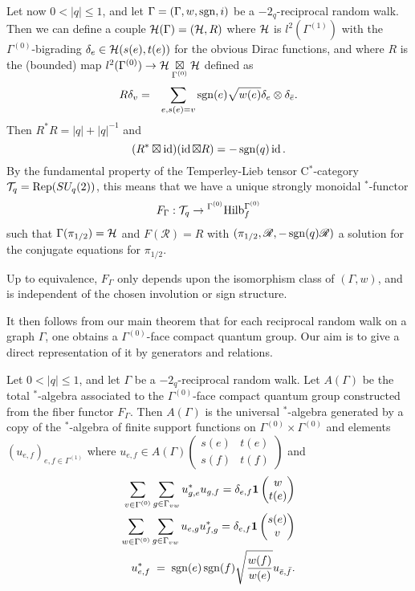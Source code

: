 Let now $0<|q|\leq 1$, and let $\Gamma = (\Gamma,w,\operatorname{\mathrm{sgn}},i)$ be a $-2_q$-reciprocal random walk. Then we can define a couple $\mathcal{H}(\Gamma) = (\mathcal{H},R)$ where $\mathcal{H}$ is $l^2(\Gamma^{(1)})$ with the $\Gamma^{(0)}$-bigrading $\delta_e \in \mathcal{H}(s(e),t(e))$ for the obvious Dirac functions, and where $R$ is the (bounded) map $l^2(\Gamma^{(0)})\rightarrow \mathcal{H}\underset{\Gamma^{(0)}}{\boxtimes} \mathcal{H}$ defined as \begin{eqnarray*} R\delta_v &=& \sum_{e,s(e) = v} \operatorname{\mathrm{sgn}}(e)\sqrt{w(e)}\delta_e \otimes \delta_{\bar{e}}.\end{eqnarray*} Then $R^*R = |q|+|q|^{-1}$ and \[(R^*\boxtimes \operatorname{id})(\operatorname{id}\boxtimes R) = -\operatorname{\mathrm{sgn}}(q)\operatorname{id}.\] By the fundamental property of the Temperley-Lieb tensor C$^*$-category $\mathcal{T}_q = \mathrm{Rep}(SU_q(2))$, this means that we have a unique strongly monoidal $^*$-functor
\[F_{\Gamma}:\mathcal{T}_q \rightarrow {}^{\Gamma^{(0)}}\mathrm{Hilb}_f^{\Gamma^{(0)}}\] such that $\Gamma(\pi_{1/2}) = \mathcal{H}$ and $F(\mathscr{R}) = R$ with $(\pi_{1/2},\mathscr{R},-\operatorname{\mathrm{sgn}}(q)\mathscr{R})$ a solution for the conjugate equations for $\pi_{1/2}$. 

Up to equivalence, $F_{\Gamma}$ only depends upon the isomorphism class of $(\Gamma,w)$, and is independent of the chosen involution or sign structure.

It then follows from our main theorem that for each reciprocal random walk on a graph $\Gamma$, one obtains a $\Gamma^{(0)}$-face compact quantum group. Our aim is to give a direct representation of it by generators and relations.

\begin{Theorem}\label{TheoGenRel} Let $0<|q|\leq 1$, and let $\Gamma$ be a $-2_q$-reciprocal random walk. Let $A(\Gamma)$ be the total $^*$-algebra associated to the $\Gamma^{(0)}$-face compact quantum group constructed from the fiber functor $F_{\Gamma}$. Then $A(\Gamma)$ is the universal $^*$-algebra generated by a copy of the $^*$-algebra of finite support functions on $\Gamma^{(0)}\times \Gamma^{(0)}$ and elements $(u_{e,f})_{e,f\in \Gamma^{(1)}}$ where $u_{e,f}\in A(\Gamma)\begin{pmatrix} s(e) & t(e)\\ s(f)&t(f)\end{pmatrix}$ and 
\begin{eqnarray*} 
\sum_{v\in \Gamma^{(0)}}\sum_{g\in \Gamma_{vw}} u_{g,e}^*u_{g,f} = \delta_{e,f}\mathbf{1}\begin{pmatrix} w \\ t(e)\end{pmatrix}\\
\sum_{w\in \Gamma^{(0)}} \sum_{g\in \Gamma_{vw}} u_{e,g}u_{f,g}^* = \delta_{e,f} \mathbf{1}\begin{pmatrix} s(e) \\ v\end{pmatrix}\\ 
u_{e,f}^* \;=\; \operatorname{\mathrm{sgn}}(e)\operatorname{\mathrm{sgn}}(f)\sqrt{\frac{w(f)}{w(e)}} u_{\bar{e},\bar{f}}.
\end{eqnarray*} 
\end{Theorem} 

